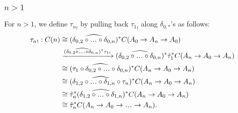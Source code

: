 \subsubsection{$n>1$}
For $n>1$, we define ${\tau_n}_!$ by 
pulling back ${\tau_1}_!$ along $\delta_{0,*}$'s 
as follows:
\begin{align*}
{\tau_n}_!: C(n) 
&\cong 
(\widehat{\delta_{0,2}\circ\smdots\circ\delta_{0,n}})^*
  C(A_0 \to A_n \to A_0)\\
&\xrightarrow{
  (\widehat{\delta_{0,2}\circ\smdots\circ\delta_{0,n}})^*
  {\tau_1}_!}
(\widehat{\delta_{0,2}\circ\smdots\circ\delta_{0,n}})^*
  \hat{\tau}_1^*C(A_n \to A_0 \to A_n)\\
&\cong
(\widehat{\tau_1\circ\delta_{0,2}\circ\smdots\circ
  \delta_{0,n}})^*C(A_n \to A_0 \to A_n)\\
&\cong
(\widehat{\delta_{1,2}\circ\smdots\circ\delta_{1,n}
  \circ \tau_n})^*C(A_n \to A_0 \to A_n)\\
&\cong
\hat{\tau}_n^*
  (\widehat{\delta_{1,2}\circ\smdots\circ\delta_{1,n}})^*
  C(A_n \to A_0 \to A_n)\\
&\cong 
\hat{\tau}_n^*C(A_n \to A_0 \to \smdots \to A_n).  
\end{align*}
